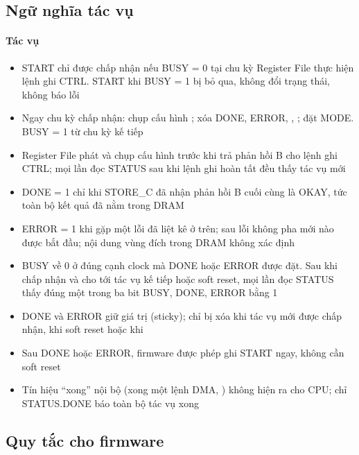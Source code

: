 \subsection{Ngữ nghĩa tác vụ}\label{sec:3.3}


\paragraph{Tác vụ}\label{tab:3-5}
\begin{itemize}
\item START chỉ được chấp nhận nếu BUSY = 0 tại chu kỳ Register File thực hiện lệnh ghi CTRL. START khi BUSY = 1 bị bỏ qua, không đổi trạng thái, không báo lỗi
\item Ngay chu kỳ chấp nhận: chụp cấu hình ; xóa DONE, ERROR, , ; đặt MODE. BUSY = 1 từ chu kỳ kế tiếp
\item Register File phát  và chụp cấu hình trước khi trả phản hồi B cho lệnh ghi CTRL; mọi lần đọc STATUS sau khi lệnh ghi hoàn tất đều thấy tác vụ mới
\item DONE = 1 chỉ khi STORE\_C đã nhận phản hồi B cuối cùng là OKAY, tức toàn bộ kết quả đã nằm trong DRAM
\item ERROR = 1 khi gặp một lỗi đã liệt kê ở trên; sau lỗi không pha mới nào được bắt đầu; nội dung vùng đích trong DRAM không xác định
\item BUSY về 0 ở đúng cạnh clock mà DONE hoặc ERROR được đặt. Sau khi chấp nhận và cho tới tác vụ kế tiếp hoặc soft reset, mọi lần đọc STATUS thấy đúng một trong ba bit BUSY, DONE, ERROR bằng 1
\item DONE và ERROR giữ giá trị (sticky); chỉ bị xóa khi tác vụ mới được chấp nhận, khi soft reset hoặc khi 
\item Sau DONE hoặc ERROR, firmware được phép ghi START ngay, không cần soft reset
\item Tín hiệu “xong” nội bộ (xong một lệnh DMA, ) không hiện ra cho CPU; chỉ STATUS.DONE báo toàn bộ tác vụ xong
\end{itemize}


\subsection{Quy tắc cho firmware}\label{sec:3.4}


